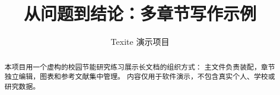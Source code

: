 \documentclass[UTF8,a4paper,11pt]{ctexart}
\title{从问题到结论：多章节写作示例}
\author{Texite 演示项目}
\date{}
\begin{document}
\maketitle
\begin{abstract}
本项目用一个虚构的校园节能研究练习展示长文档的组织方式：
主文件负责装配，章节独立编辑，图表和参考文献集中管理。
内容仅用于软件演示，不包含真实个人、学校或研究数据。
\end{abstract}
\pagestyle{plain}
\tableofcontents
\newpage


\clearpage



\end{document}
